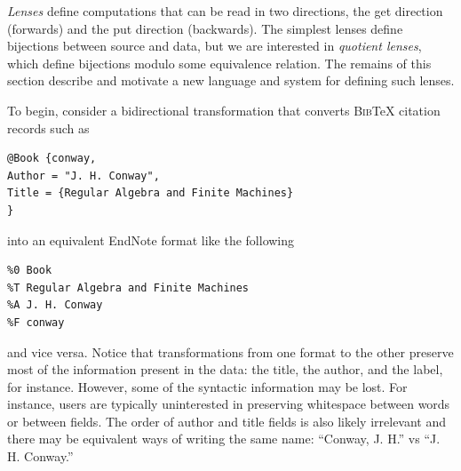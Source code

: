\documentclass[acmsmall,review,anonymous]{acmart}
\newcommand{\bibtex}{\textsc{Bib}\TeX{}}
\begin{document}

\emph{Lenses} define computations that can be read in two directions,
the get direction (forwards) and the put direction (backwards).  The simplest lenses define bijections between source and
data, but we are interested in \emph{quotient lenses}, which define
bijections modulo some equivalence relation.  The remains of this section
describe and motivate a new language and system for defining such lenses.

To begin, consider a bidirectional transformation that converts
\bibtex{} citation records such as
\begin{verbatim}
@Book {conway,
Author = "J. H. Conway",
Title = {Regular Algebra and Finite Machines}
}
\end{verbatim}
\noindent
into an equivalent EndNote format like the following
\begin{verbatim}
%0 Book
%T Regular Algebra and Finite Machines
%A J. H. Conway
%F conway
\end{verbatim}
\noindent
and vice versa.
%
Notice that transformations from one format to the other preserve
most of the information present in the data:  the title, the author,
and the label, for instance.  However, some of the syntactic information
may be lost.  For instance, users are typically uninterested in preserving
whitespace between words or
between fields.  The order of author and title fields is also likely
irrelevant and there may be equivalent ways of writing the same
name:  ``Conway, J. H.'' vs ``J. H. Conway.''

\end{document}
